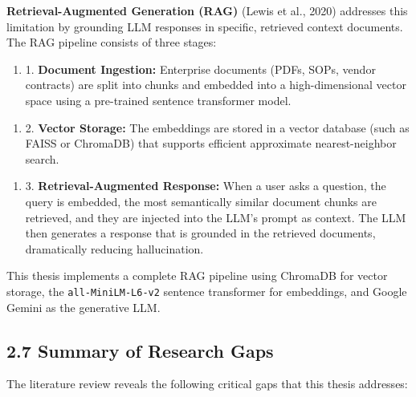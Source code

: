 \documentclass[12pt, a4paper]{report}
\begin{document}
\textbf{Retrieval-Augmented Generation (RAG)} (Lewis et al., 2020) addresses this limitation by grounding LLM responses in specific, retrieved context documents. The RAG pipeline consists of three stages:

\begin{enumerate}
\item 1. \textbf{Document Ingestion:} Enterprise documents (PDFs, SOPs, vendor contracts) are split into chunks and embedded into a high-dimensional vector space using a pre-trained sentence transformer model.
\end{enumerate}

\begin{enumerate}
\item 2. \textbf{Vector Storage:} The embeddings are stored in a vector database (such as FAISS or ChromaDB) that supports efficient approximate nearest-neighbor search.
\end{enumerate}

\begin{enumerate}
\item 3. \textbf{Retrieval-Augmented Response:} When a user asks a question, the query is embedded, the most semantically similar document chunks are retrieved, and they are injected into the LLM's prompt as context. The LLM then generates a response that is grounded in the retrieved documents, dramatically reducing hallucination.
\end{enumerate}

This thesis implements a complete RAG pipeline using ChromaDB for vector storage, the \texttt{all-MiniLM-L6-v2} sentence transformer for embeddings, and Google Gemini as the generative LLM.

\subsection{2.7 Summary of Research Gaps}

The literature review reveals the following critical gaps that this thesis addresses:
\end{document}
